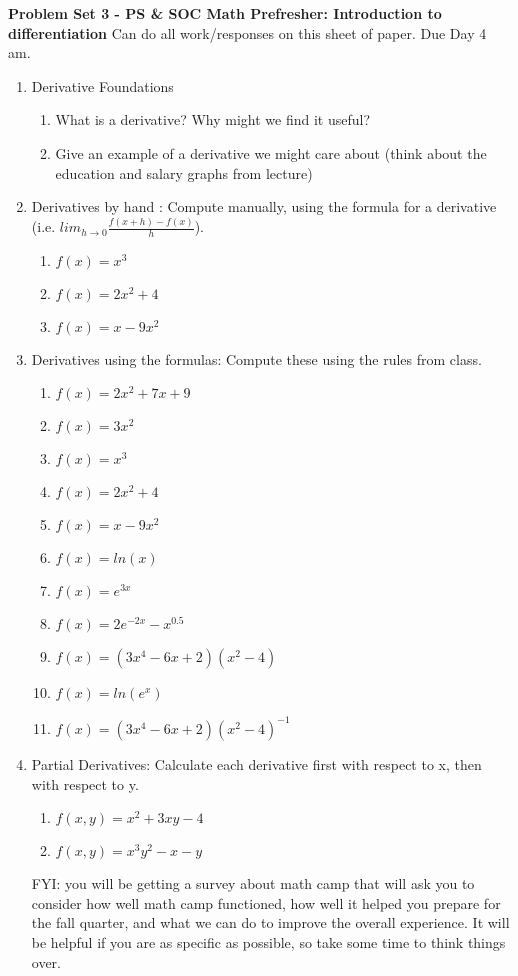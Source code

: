 \documentclass[11pt]{article}
\begin{document}
\noindent \textbf{Problem Set 3 - PS \& SOC Math Prefresher: Introduction to differentiation }
Can do all work/responses on this sheet of paper. Due Day 4 am. 

\begin{enumerate}
\item Derivative Foundations
\begin{enumerate}
\item What is a derivative? Why might we find it useful? 
\item Give an example of a derivative we might care about (think about the education and salary graphs from lecture) 
\end{enumerate}

\item Derivatives by hand : Compute manually, using the formula for a derivative (i.e. $ lim_{h\rightarrow0}\frac{f(x+h)-f(x)}{h}$). 
\begin{enumerate}
\item  $f(x) =x^3$
\item  $f(x) =2x^2+4$
\item  $f(x) =x-9x^2$ 
\end{enumerate}

\item Derivatives using the formulas: Compute these using the rules from class. 
\begin{enumerate}
\item  $f(x) = 2x^2 + 7x + 9$ 
\item  $f(x) = 3x^2$
\item  $f(x) =x^3$
\item  $f(x) =2x^2+4$
\item  $f(x) =x-9x^2$
\item  $f(x)=ln(x)$
\item $f(x)=e^{3x}$
\item $f(x)=2e^{-2x}-x^{0.5}$
\item $f(x)=(3x^4-6x+2)(x^2-4)$
\item $f(x)=ln(e^x)$
\item $f(x)=(3x^4-6x+2)(x^2-4)^{-1}$
\end{enumerate}

\item Partial Derivatives: Calculate each derivative first with respect to x, then with respect to y. 
\begin{enumerate}
\item $f(x,y)=x^2+3xy-4$
\item $f(x,y)=x^3y^2-x-y$
\end{enumerate}

\vspace{6mm}
 FYI: you will be getting a survey about math camp that will ask you to consider how well math camp functioned, how well it helped you prepare for the fall quarter, and what we can do to improve the overall experience. It will be helpful if you are as specific as possible, so take some time to think things over. 

\end{enumerate}
\end{document}
